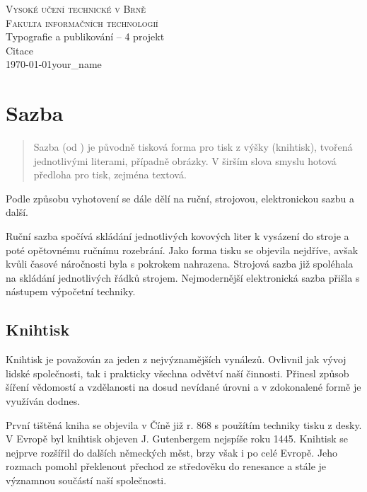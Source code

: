 \documentclass[a4paper, 11pt]{article}
\begin{document}
\begin{titlepage}
    \begin{center}
        \textsc{\Huge Vysoké učení technické v Brně \\[3.5mm] \huge Fakulta informačních technologií}\\
        {\LARGE Typografie a publikování -- 4 projekt\\
        \huge Citace\\}
        \Large \today \hfill your\_name
    \end{center}
\end{titlepage}

\section{Sazba}

\begin{quote}
    Sazba (od ) je původně tisková forma pro tisk z výšky (knihtisk), tvořená jednotlivými literami, případně obrázky. V širším slova smyslu hotová předloha pro tisk, zejména textová. \cite{sazbaWiki}
\end{quote}


Podle způsobu vyhotovení se dále dělí na ruční, strojovou, elektronickou sazbu a další.

Ruční sazba spočívá skládání jednotlivých kovových liter k vysázení do stroje a poté opětovnému ručnímu rozebrání. Jako forma tisku se objevila nejdříve, avšak kvůli časové náročnosti byla s pokrokem nahrazena. Strojová sazba již spoléhala na skládání jednotlivých řádků strojem. Nejmodernější elektronická sazba přišla s nástupem výpočetní techniky. \cite{Ottova2003} \cite{sazbaWiki}

\subsection{Knihtisk}
    Knihtisk je považován za jeden z nejvýznamějších vynálezů. Ovlivnil jak vývoj lidské společnosti, tak i prakticky všechna odvětví naší činnosti. Přinesl způsob šíření vědomostí a vzdělanosti na dosud nevídané úrovni a v zdokonalené formě je využíván dodnes. \cite{Otazniky2014} \cite{ABCknihtisk} \cite{Mensik2013}

    První tištěná kniha se objevila v Číně již r. 868 s použítím techniky tisku z desky. V Evropě byl knihtisk objeven J. Gutenbergem nejspíše roku 1445. Knihtisk se nejprve rozšířil do dalších německých měst, brzy však i po celé Evropě. Jeho rozmach pomohl překlenout přechod ze středověku do renesance a stále je významnou součástí naší společnosti. \cite{Ottova2003} \cite{Steinberg1996} \cite{Voit2008}
\end{document}
